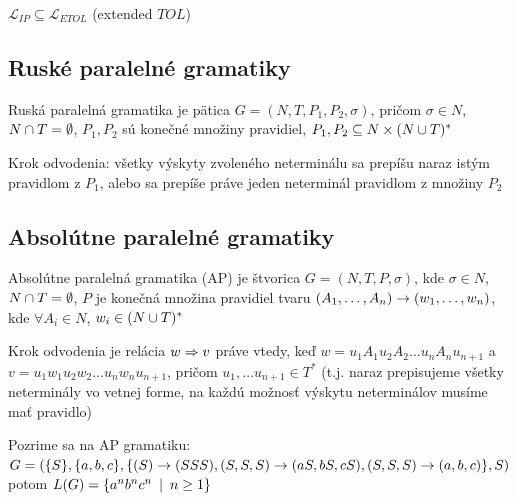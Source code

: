 \begin{veta}
  $\mathcal{L}_{IP}\subseteq\mathcal{L}_{ETOL}$ (extended $TOL$)
\end{veta}

\subsection{Ruské paralelné gramatiky}

\begin{definicia}
  Ruská paralelná gramatika je pätica $G=(N,T,P_{1},P_{2},\sigma)$,
  pričom $\sigma\in N$, \mbox{$N\cap T=\emptyset$}, $P_{1}, P_{2}$
  sú konečné množiny pravidiel, $P_{1},P_{2}\subseteq N\times(N\cup
  T)^{*}$
\end{definicia}

\begin{definicia}
  Krok odvodenia: všetky výskyty zvoleného neterminálu sa prepíšu
  naraz istým pravidlom z $P_{1}$, alebo sa prepíše práve jeden
  neterminál pravidlom z množiny $P_{2}$
\end{definicia}

\subsection{Absolútne paralelné gramatiky}

\begin{definicia}
  Absolútne paralelná gramatika (AP) je štvorica $G=(N,T,P,\sigma)$,
  kde \mbox{$\sigma\in N$}, $N\cap T=\emptyset$, $P$ je konečná
  množina pravidiel tvaru
  $(A_{1},\dots,A_{n})\rightarrow(w_{1},\dots,w_{n})$, kde \mbox{$\forall
  A_{i}\in N$}, $w_{i}\in(N\cup T)^{*}$
\end{definicia}

\begin{definicia}
  Krok odvodenia je relácia $w\Rightarrow v$ práve vtedy, keď
  $w=u_{1}A_{1}u_{2}A_{2}\dots u_{n}A_{n}u_{n+1}$ \mbox{a
  $v=u_{1}w_{1}u_{2}w_{2}\dots u_{n}w_{n}u_{n+1}$}, pričom
  $u_{1},\dots u_{n+1}\in T^{*}$ (t.j. naraz prepisujeme všetky
  neterminály vo vetnej forme, na každú možnosť výskytu neterminálov
  musíme mať pravidlo)
\end{definicia}

\begin{priklad}
  Pozrime sa na AP gramatiku:\\
  $G=(\{S\},\{a,b,c\},\{(S)\rightarrow(SSS),(S,S,S)\rightarrow (aS,bS,cS),(S,S,S)\rightarrow
  (a,b,c)\},S)$ potom $L(G)=\{a^{n}b^{n}c^{n}\enspace |\enspace n\geq1\}$
\end{priklad}

